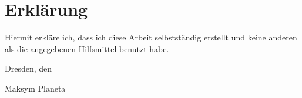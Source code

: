  

\section*{\vfill{} \thispagestyle{empty}
Erklärung}

Hiermit erkläre ich, dass ich diese Arbeit selbstständig erstellt
und keine anderen als die angegebenen Hilfsmittel benutzt habe.
\bigskip{}

\noindent Dresden, den \printdate %
\vspace{2.5cm}

\noindent Maksym Planeta \cleardoublepage{}
